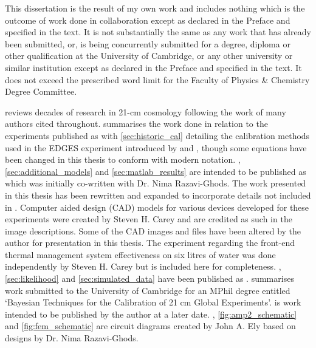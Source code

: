 
\begin{declaration}

This dissertation is the result of my own work and includes nothing which is the outcome of work done in collaboration except as declared in the Preface and specified in the text. It is not substantially the same as any work that has already been submitted, or, is being concurrently submitted for a degree, diploma or other qualification at the University of Cambridge, or any other university or similar institution except as declared in the Preface and specified in the text. It does not exceed the prescribed word limit for the Faculty of Physics \& Chemistry Degree Committee.

 reviews decades of research in 21-cm cosmology following the work of many authors cited throughout.  summarises the work done in relation to the experiments published as \citet{edgesNature} with \cref{sec:historic_cal} detailing the calibration methods used in the EDGES experiment introduced by \citet{rogersCal} and \citet{edgesCal}, though some equations have been changed in this thesis to conform with modern notation. , \cref{sec:additional_models} and \cref{sec:matlab_results} are intended to be published as \mbox{\citet{nimaCal}} which was initially co-written with Dr. Nima Razavi-Ghods. The work presented in this thesis has been rewritten and expanded to incorporate details not included in \citet{nimaCal}. Computer aided design (CAD) models for various devices developed for these experiments were created by Steven H. Carey and are credited as such in the image descriptions. Some of the CAD images and files have been altered by the author for presentation in this thesis. The experiment regarding the front-end thermal management system effectiveness on six litres of water was done independently by Steven H. Carey but is included here for completeness. , \cref{sec:likelihood} and \cref{sec:simulated_data} have been published as \citet{ian_bayes}.  summarises work submitted to the University of Cambridge for an MPhil degree entitled ‘Bayesian Techniques for the Calibration of 21 cm Global Experiments’.  is work intended to be published by the author at a later date. , \cref{fig:amp2_schematic} and \cref{fig:fem_schematic} are circuit diagrams created by John A. Ely based on designs by Dr. Nima Razavi-Ghods.


\end{declaration}
